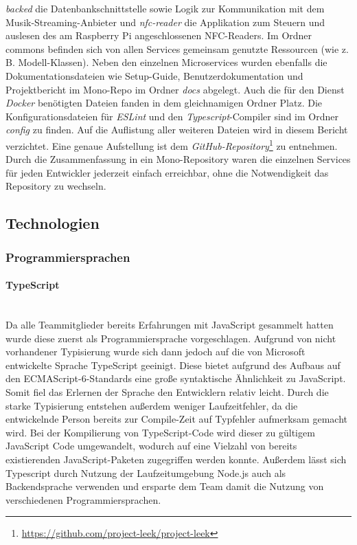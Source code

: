 \documentclass[10pt, a4paper]{article}
\begin{document}
\textit{backed} die Datenbankschnittstelle sowie Logik zur Kommunikation mit dem Musik-Streaming-Anbieter und \textit{nfc-reader} die Applikation zum Steuern und auslesen des am Raspberry Pi angeschlossenen NFC-Readers.
Im Ordner commons befinden sich von allen Services gemeinsam genutzte Ressourcen (wie z. B. Modell-Klassen).
Neben den einzelnen Microservices wurden ebenfalls die Dokumentationsdateien wie Setup-Guide, Benutzerdokumentation und Projektbericht im Mono-Repo im Ordner \textit{docs} abgelegt.
Auch die für den Dienst \textit{Docker} benötigten Dateien fanden in dem gleichnamigen Ordner Platz. Die Konfigurationsdateien für \textit{ESLint} und den \textit{Typescript}-Compiler sind im Ordner \textit{config} zu finden.
Auf die Auflistung aller weiteren Dateien wird in diesem Bericht verzichtet. Eine genaue Aufstellung ist dem \textit{GitHub-Repository}\footnote{\url{https://github.com/project-leek/project-leek}} zu entnehmen.
Durch die Zusammenfassung in ein Mono-Repository waren die einzelnen Services für jeden Entwickler jederzeit einfach erreichbar, ohne die Notwendigkeit das Repository zu wechseln.

\subsection{Technologien}
\label{technologien}

\subsubsection{Programmiersprachen}

\paragraph*{TypeScript} $~$ \\
Da alle Teammitglieder bereits Erfahrungen mit JavaScript gesammelt hatten wurde diese zuerst als Programmiersprache vorgeschlagen.
Aufgrund von nicht vorhandener Typisierung wurde sich dann jedoch auf die von Microsoft entwickelte Sprache TypeScript geeinigt. Diese bietet aufgrund des
Aufbaus auf den ECMAScript-6-Standards eine große syntaktische Ähnlichkeit zu JavaScript. Somit fiel das Erlernen der Sprache den Entwicklern relativ leicht.
Durch die starke Typisierung entstehen außerdem weniger Laufzeitfehler, da die entwickelnde Person bereits zur Compile-Zeit auf Typfehler aufmerksam gemacht wird.\cite{Typescript_Typisierung}
Bei der Kompilierung von TypeScript-Code wird dieser zu gültigem JavaScript Code umgewandelt, wodurch auf eine Vielzahl von bereits existierenden JavaScript-Paketen zugegriffen werden konnte.
Außerdem lässt sich Typescript durch Nutzung der Laufzeitumgebung Node.js auch als Backendsprache verwenden und ersparte dem Team damit die Nutzung von verschiedenen Programmiersprachen.
\end{document}
